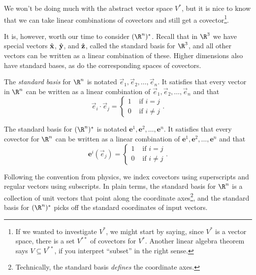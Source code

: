 We won't be doing much with the abstract vector space $V^*$, but it is
nice to know that we can take linear combinations of covectors
and still get a covector\footnote{ If we wanted to investigate $V^*$,
we might start by saying, since $V^*$ is a vector space, there is
a set $V^{**}$ of covectors for $V^*$.  Another linear algebra theorem
says $V\subseteq V^{**}$, if you interpret ``subset'' in the right sense. }.

It is, however, worth our time to consider $(\R^n)^*$.  Recall that
in $\R^3$ we have special vectors ${\hat {\mathbf x}}$, ${\hat {\mathbf y}}$, and ${\hat {\mathbf z}}$,
called the standard basis for $\R^3$,
and all other vectors can be written as a linear combination of these.
Higher dimensions also have standard bases, as do the corresponding
spaces of covectors.

\begin{definition}
	The \emph{standard basis} for $\R^n$ is notated 
	$\vec e_1,\vec e_2,\ldots,\vec e_n$. It satisfies that 
	every vector in $\R^n$ can be written as a linear combination of
	$\vec e_1,\vec e_2,\ldots,\vec e_n$ and that
	\[
		\vec e_i\cdot \vec e_j = \begin{cases}
			1 &\text{ if } i=j\\
			0 &\text{ if } i\neq j
		\end{cases}.
	\]

	The standard basis for $(\R^n)^*$ is notated
	$\bm e^1,\bm e^2,\ldots,\bm e^n$. It satisfies that
	every covector for $\R^n$ can be written as a linear combination of
	$\bm e^1,\bm e^2,\ldots,\bm e^n$ and that
	\[
		\bm e^i(\vec e_j) = \begin{cases}
			1 &\text{ if } i=j\\
			0 &\text{ if } i\neq j
		\end{cases}.
	\]
\end{definition}

Following the convention from physics, we index covectors using superscripts
and regular vectors using subscripts.  In plain terms, the standard basis for
$\R^n$ is a collection of unit vectors that point along the coordinate axes\footnote{
Technically, the standard basis \emph{defines} the coordinate axes.}, and the
standard basis for $(\R^n)^*$ picks off the standard coordinates of input
vectors.

